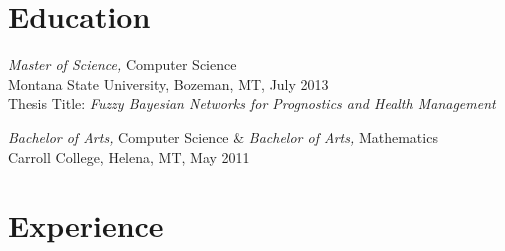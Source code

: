 \documentclass[line,margin]{res}
\begin{document}
\address{2157 Pacific Ave B103, Costa Mesa, CA 92627}
\address{(949) 293-4039 -  nick.ryhajlo@gmail.com}

 
\begin{resume}
 
\section{Education} {\sl Master of Science,} Computer Science \\
                Montana State University, Bozeman, MT, July 2013 \\
                Thesis Title: \textit{Fuzzy Bayesian Networks for Prognostics and Health Management}

				{\sl Bachelor of Arts,} Computer Science \& {\sl Bachelor of Arts,} Mathematics \\
                Carroll College, Helena, MT, 
                May 2011
                
\section{Experience}


\end{resume}
\end{document}
